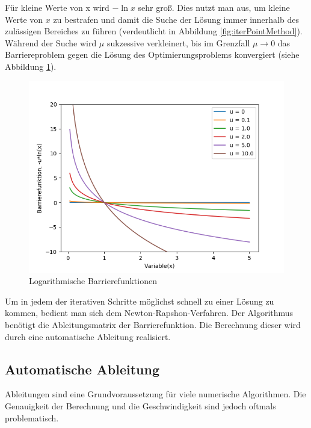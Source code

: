 \documentclass{like}
\begin{document}
Für kleine Werte von x wird $-\ln x $ sehr groß. Dies nutzt man aus, um kleine Werte von \(x\) zu bestrafen und damit die Suche der Lösung immer innerhalb des zulässigen Bereiches zu führen (verdeutlicht in Abbildung \ref{fig:iterPointMethod}). Während der Suche wird \(\mu\) sukzessive verkleinert, bis im Grenzfall $ \mu \rightarrow 0$ das Barriereproblem gegen die Lösung des Optimierungsproblems konvergiert (siehe Abbildung \ref{fig:iterPointLn}).\\

\begin{figure}[ht!]
	\centering
	\includegraphics[width=350pt]{Abbildungen/intPointLn.png}
	\caption{Logarithmische Barrierefunktionen}
	\label{fig:iterPointLn}
\end{figure}

Um in jedem der iterativen Schritte möglichst schnell zu einer Lösung zu kommen, bedient man sich dem Newton-Rapshon-Verfahren. 
Der Algorithmus benötigt die Ableitungsmatrix der Barrierefunktion. Die Berechnung dieser wird durch eine automatische Ableitung realisiert.

\subsection{Automatische Ableitung} 

Ableitungen sind eine Grundvoraussetzung für viele numerische Algorithmen. Die Genauigkeit der Berechnung und die Geschwindigkeit sind jedoch oftmals problematisch.
\end{document}

